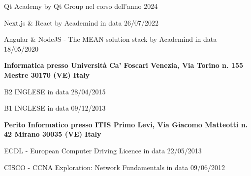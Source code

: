
\begin{scholarship}
    {Qt Academy by Qt Group nel corso dell'anno 2024}

    {Next.js \& React by Academind in data 26/07/2022}

    {Angular \& NodeJS - The MEAN solution stack by Academind in data 18/05/2020}

    {\textbf{Informatica presso Università Ca' Foscari Venezia, Via Torino n. 155 Mestre 30170 (VE) Italy}}

    {B2 INGLESE in data 28/04/2015}

    {B1 INGLESE in data 09/12/2013}

    {\textbf{Perito Informatico presso ITIS Primo Levi, Via Giacomo Matteotti n. 42 Mirano 30035 (VE) Italy}}

    {ECDL - European Computer Driving Licence in data 22/05/2013}

    {CISCO - CCNA Exploration: Network Fundamentals in data 09/06/2012}
\end{scholarship}
